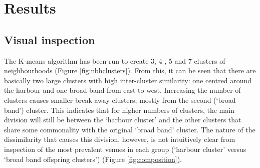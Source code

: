\documentclass{article}
\begin{document}
\section{Results}
\subsection{Visual inspection}
The K-means algorithm has been run to create 3, 4 , 5 and 7 clusters of neighbourhoods (Figure \ref{fig:nbhclusters}). From this, it can be seen that there are basically two large clusters with high inter-cluster similarity: one centred around the harbour and one broad band from east to west. Increasing the number of clusters causes smaller break-away clusters, mostly from the second (`broad band') cluster. This indicates that for higher numbers of clusters, the main division will still be between the `harbour cluster' and the other clusters that share some commonality with the original `broad band' cluster. The nature of the dissimilarity that causes this division, however, is not intuitively clear from inspection of the most prevalent venues in each group (`harbour cluster' versus `broad band offspring clusters') (Figure \ref{fig:composition}).
\end{document}
